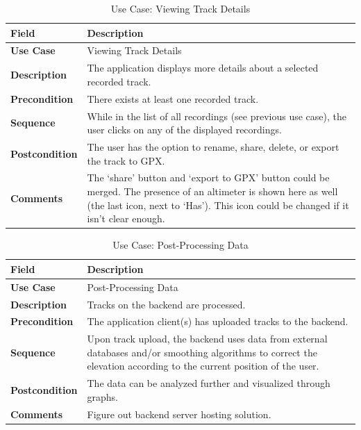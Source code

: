\documentclass[12pt]{article}
\begin{document}
\begin{table}[h!]
\centering
\begin{tabular}{|p{3cm}|p{11cm}|}
\hline
\textbf{Field} & \textbf{Description} \\
\hline
\textbf{Use Case}   & Viewing Track Details \\
\hline
\textbf{Description} & The application displays more details about a selected recorded track. \\
\hline
\textbf{Precondition} & There exists at least one recorded track. \\
\hline
\textbf{Sequence} & While in the list of all recordings (see previous use case), the user clicks on any of the displayed recordings. \\
\hline
\textbf{Postcondition} & The user has the option to rename, share, delete, or export the track to GPX. \\
\hline
\textbf{Comments} & The ‘share’ button and ‘export to GPX’ button could be merged. The presence of an altimeter is shown here as well (the last icon, next to ‘Has’). This icon could be changed if it isn’t clear enough. \\
\hline
\end{tabular}
\caption{Use Case: Viewing Track Details}
\end{table}

\begin{table}[h!]
\centering
\begin{tabular}{|p{3cm}|p{11cm}|}
\hline
\textbf{Field} & \textbf{Description} \\
\hline
\textbf{Use Case}   & Post-Processing Data \\
\hline
\textbf{Description} & Tracks on the backend are processed. \\
\hline
\textbf{Precondition} & The application client(s) has uploaded tracks to the backend. \\
\hline
\textbf{Sequence} & Upon track upload, the backend uses data from external databases and/or smoothing algorithms to correct the elevation according to the current position of the user. \\
\hline
\textbf{Postcondition} & The data can be analyzed further and visualized through graphs. \\
\hline
\textbf{Comments} & Figure out backend server hosting solution. \\
\hline
\end{tabular}
\caption{Use Case: Post-Processing Data}
\end{table}
\end{document}
